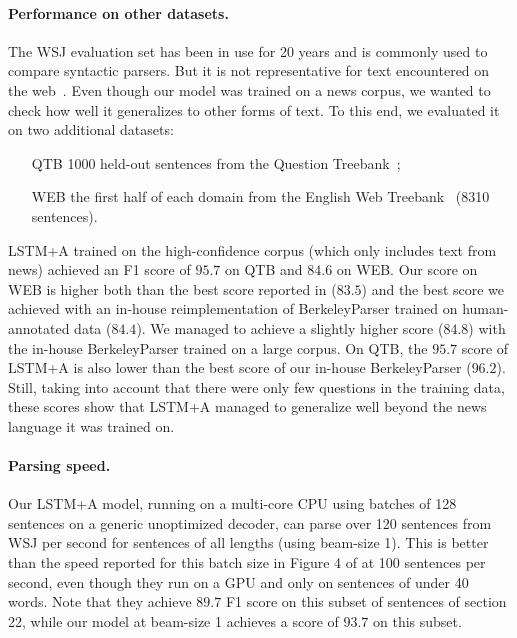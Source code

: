 \documentclass{article} \usepackage{nips15submit_e,times}
\newcommand\citep\cite
\begin{document}
\paragraph{Performance on other datasets.}
The WSJ evaluation set has been in use for 20 years and is commonly used
to compare syntactic parsers. But it is not representative for text
encountered on the web~\citep{petrov-mcdonald:2012:SANCL}. Even though
our model was trained on a news corpus, we wanted to check how well it
generalizes to other forms of text. To this end, we evaluated it on two
additional datasets:
\begin{itemize}
\item[QTB] 1000 held-out sentences from the Question
  Treebank~\cite{judge-etAl:2006:ACL};
\item[WEB] the first half of each domain from the English Web
  Treebank~\cite{petrov-mcdonald:2012:SANCL} (8310 sentences).
\end{itemize}
LSTM+A trained on the high-confidence corpus (which only includes text from
news) achieved an F1 score of $95.7$ on QTB and $84.6$ on WEB.
Our score on WEB is higher both than the best score reported
in \cite{petrov-mcdonald:2012:SANCL} ($83.5$) and the best score
we achieved with an in-house reimplementation of BerkeleyParser trained
on human-annotated data ($84.4$). We managed to achieve a slightly higher
score ($84.8$) with the in-house BerkeleyParser trained on a large corpus.
On QTB, the $95.7$ score of LSTM+A is also lower than the best score of
our in-house BerkeleyParser ($96.2$). Still, taking into account that there
were only few questions in the training data, these scores show that
LSTM+A managed to generalize well beyond the news language it was trained on.

\paragraph{Parsing speed.}
Our LSTM+A model, running on a multi-core CPU using batches of 128 sentences
on a generic unoptimized decoder, can parse over 120 sentences from WSJ per second
for sentences of all lengths (using beam-size 1). This is better than the speed
reported for this batch size in Figure 4 of \citep{hall2014sparser} at 100 sentences
per second, even though they run on a GPU and only on sentences of under 40 words.
Note that they achieve $89.7$ F1 score on this subset of sentences of section 22,
while our model at beam-size 1 achieves a score of $93.7$ on this subset.
 \vspace{-0mm}
\end{document}
